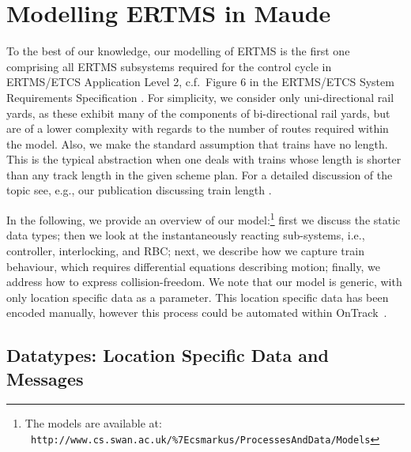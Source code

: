 \section{Modelling ERTMS in Maude}

To the best of our knowledge, our modelling of ERTMS is the first one
comprising all ERTMS subsystems required for the control cycle in
ERTMS/ETCS Application Level 2, c.f.\ Figure 6 in the ERTMS/ETCS
System Requirements Specification \cite{spec}. For simplicity, we
consider only uni-directional rail yards, as these exhibit many of the
components of bi-directional rail yards, but are of a lower complexity
with regards to the number of routes required within the model. Also,
we make the standard assumption that trains have no length. This is
the typical abstraction when one deals with trains whose length is
shorter than any track length in the given scheme plan. For a detailed
discussion of the topic see, e.g., our publication discussing train
length \cite{JamesMNRST14}.

In the following, we provide an overview of our model:\footnote{The models are available at:\\
{\tt \footnotesize
 http://www.cs.swan.ac.uk/\%7Ecsmarkus/ProcessesAndData/Models}} first we discuss the static
data types; then we look at the instantaneously reacting
sub-systems, i.e., controller, interlocking, and RBC; next, we
describe how we capture  train behaviour, which requires
differential equations describing motion; finally, we address how to
express collision-freedom. We note that our model is generic, with only
location specific data as a parameter. This location specific data has been encoded manually, however this process could be automated within OnTrack~\cite{james14c}.


\subsection{Datatypes: Location Specific Data and Messages}




